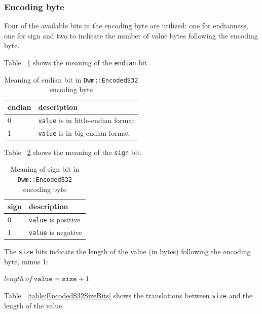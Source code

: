 
\subsubsection{Encoding byte}

Four of the available bits in the encoding byte are utilized: one for
endianness, one for sign and two to indicate the number of value
bytes following the encoding byte.

  Table
~\ref{table:EncodedS32EndianBit} shows the meaning of the
\texttt{endian} bit.

\begin{table}[H]
\begin{center}
\begin{tabular}{ll}
  \textbf{endian} & \textbf{description} \\ \hline
  0 & \texttt{value} is in little-endian format \\ \hline
  1 & \texttt{value} is in big-endian format \\
\end{tabular}
\caption{Meaning of endian bit in \texttt{Dwm::EncodedS32} encoding byte}
\label{table:EncodedS32EndianBit}
\end{center}
\end{table}

Table ~\ref{table:EncodedS32SignBit} shows the meaning of the
\texttt{sign} bit.

\begin{table}[H]
\begin{center}
\begin{tabular}{ll}
  \textbf{sign} & \textbf{description} \\ \hline
  0 & \texttt{value} is positive \\ \hline
  1 & \texttt{value} is negative \\
\end{tabular}
\caption{Meaning of sign bit in \texttt{Dwm::EncodedS32} encoding byte}
\label{table:EncodedS32SignBit}
\end{center}
\end{table}

The \texttt{size} bits indicate the length of the value (in bytes)
following the encoding byte, minus 1:

  $length\ of\ \texttt{value} = \texttt{size} + 1$

Table ~\ref{table:EncodedS32SizeBits} shows the translations between
\texttt{size} and the length of the value.

